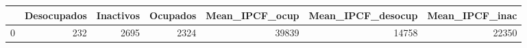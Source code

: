 \begin{tabular}{lrrrrrr}
\toprule
{} &  Desocupados &  Inactivos &  Ocupados &  Mean\_IPCF\_ocup &  Mean\_IPCF\_desocup &  Mean\_IPCF\_inac \\
\midrule
0 &          232 &       2695 &      2324 &           39839 &              14758 &           22350 \\
\bottomrule
\end{tabular}
